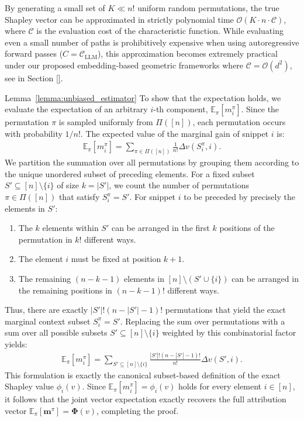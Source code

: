 By generating a small set of $K \ll n!$ uniform random permutations, the true Shapley vector can be approximated in strictly polynomial time $\mathcal{O}(K \cdot n \cdot \mathcal{C})$, where $\mathcal{C}$ is the evaluation cost of the characteristic function.  While evaluating even a small number of paths is prohibitively expensive when using autoregressive forward passes ($C = \mathcal{C}_{\text{LLM}}$), this approximation becomes extremely practical under our proposed embedding-based geometric frameworks where $\mathcal{C} = \mathcal{O}(d^2)$, see in Section \ref{}.


\begin{proofof}{Lemma~\ref{lemma:unbiased_estimator}}
To show that the expectation holds, we evaluate the expectation of an arbitrary $i$-th component, $\mathbb{E}_\pi[m_i^\pi]$. Since the permutation $\pi$ is sampled uniformly from $\Pi([n])$, each permutation occurs with probability $1/n!$. The expected value of the marginal gain of snippet $i$ is:
\begin{align}
    \mathbb{E}_{\pi}[m_i^\pi] = \sum_{\pi \in \Pi([n])} \frac{1}{n!} \Delta v(S_i^\pi, i).
\end{align}
We partition the summation over all permutations by grouping them according to the unique unordered subset of preceding elements. For a fixed subset $S' \subseteq [n] \setminus \{i\}$ of size $k = |S'|$, we count the number of permutations $\pi \in \Pi([n])$ that satisfy $S_i^\pi = S'$. For snippet $i$ to be preceded by precisely the elements in $S'$:
\begin{enumerate}
    \item The $k$ elements within $S'$ can be arranged in the first $k$ positions of the permutation in $k!$ different ways.
    \item The element $i$ must be fixed at position $k + 1$.
    \item The remaining $(n - k - 1)$ elements in $[n] \setminus (S' \cup \{i\})$ can be arranged in the remaining positions in $(n - k - 1)!$ different ways.
\end{enumerate}
Thus, there are exactly $|S'|!(n - |S'| - 1)!$ permutations that yield the exact marginal context subset $S_i^\pi = S'$. Replacing the sum over permutations with a sum over all possible subsets $S' \subseteq [n] \setminus \{i\}$ weighted by this combinatorial factor yields:
\begin{align}
    \mathbb{E}_{\pi}[m_i^\pi] = \sum_{S' \subseteq [n] \setminus \{i\}} \frac{|S'|!(n - |S'| - 1)!}{n!} \Delta v(S', i).
\end{align}
This formulation is exactly the canonical subset-based definition of the exact Shapley value $\phi_i(v)$. Since $\mathbb{E}_{\pi}[m_i^\pi] = \phi_i(v)$ holds for every element $i \in [n]$, it follows that the joint vector expectation exactly recovers the full attribution vector $\mathbb{E}_\pi[\mathbf{m}^\pi] = \boldsymbol{\Phi}(v)$, completing the proof.
\end{proofof}

